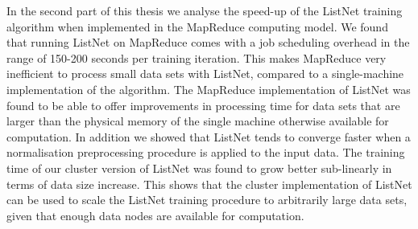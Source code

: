 In the second part of this thesis we analyse the speed-up of the ListNet training algorithm when implemented in the MapReduce computing model. We found that running ListNet on MapReduce comes with a job scheduling overhead in the range of 150-200 seconds per training iteration. This makes MapReduce very inefficient to process small data sets with ListNet, compared to a single-machine implementation of the algorithm. The MapReduce implementation of ListNet was found to be able to offer improvements in processing time for data sets that are larger than the physical memory of the single machine otherwise available for computation. In addition we showed that ListNet tends to converge faster when a normalisation preprocessing procedure is applied to the input data. The training time of our cluster version of ListNet was found to grow better sub-linearly in terms of data size increase. This shows that the cluster implementation of ListNet can be used to scale the ListNet training procedure to arbitrarily large data sets, given that enough data nodes are available for computation.



\endgroup			

\vfill